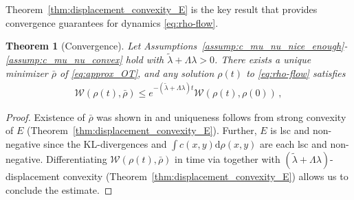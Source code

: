 \documentclass[11pt,a4paper,final]{article}
\newcommand{\Wass}{\mathscr{W}}
\renewcommand{\d}{\mathrm{d}}
\newcommand{\1}{\mathbf{1}}
\theoremstyle{plain}
\newtheorem{theorem}{Theorem}
\numberwithin{equation}{section}
\numberwithin{theorem}{section}
\begin{document}
Theorem~\ref{thm:displacement_convexity_E} is the key result that provides convergence guarantees for dynamics \eqref{eq:rho-flow}. 
\begin{theorem}[Convergence]\label{thm:cv}
    Let Assumptions~\ref{assump:c_mu_nu_nice_enough}-\ref{assump:c_mu_nu_convex} hold with $\tilde \lambda + \Lambda \lambda>0$. There exists a unique minimizer $\bar \rho$ of \eqref{eq:approx_OT}, and any solution $\rho(t)$ to \eqref{eq:rho-flow} satisfies
    \begin{align*}
    \Wass(\rho(t),\bar \rho) \le e^{-(\tilde \lambda + \Lambda \lambda)t}  \Wass(\rho(t),\rho(0))\,,
\end{align*}
\end{theorem}
\begin{proof}
    Existence of $\bar \rho$ was shown in \cite[Corollary 1]{liu_approximating_2021} and uniqueness follows from strong convexity of $E$ (Theorem~\ref{thm:displacement_convexity_E}). Further, $E$ is lsc and non-negative since the KL-divergences and $\int c(x,y)\d\rho(x,y)$ are each lsc and non-negative. Differentiating $\Wass(\rho(t),\bar \rho)$ in time via \cite[Thm 3.14]{cavagnari_dissipative_2023} together with $(\tilde \lambda + \Lambda \lambda)$-displacement convexity (Theorem~\ref{thm:displacement_convexity_E}) allows us to conclude the estimate.
\end{proof}
\end{document}
